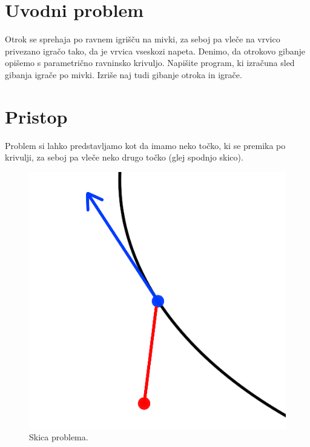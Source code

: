 \documentclass[mat1,reqno]{fmfdelo}
\begin{document}

\newpage
\section{Uvodni problem}

Otrok se sprehaja po ravnem igrišču na mivki, za seboj pa vleče na vrvico
privezano igračo tako, da je vrvica vseskozi napeta. Denimo, da otrokovo
gibanje opišemo s parametrično ravninsko krivuljo. Napišite program, ki
izračuna sled gibanja igrače po mivki. Izriše naj tudi gibanje otroka in
igrače.


\section{Pristop}

Problem si lahko predstavljamo kot da imamo neko točko, ki se premika po krivulji, za seboj pa vleče neko drugo točko (glej spodnjo skico).

\begin{figure}[!h]
\centering
\includegraphics[scale=1]{Skica problema}\\
Skica problema.
\end{figure}
\end{document}

